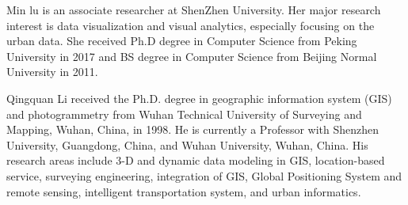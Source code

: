 \documentclass{ieeeaccess}
\begin{document}
\begin{IEEEbiography}{Min lu} is an associate researcher at ShenZhen University. Her major research interest is data visualization and visual analytics, especially focusing on the urban data. She received Ph.D degree in Computer Science from Peking University in 2017 and BS degree in Computer Science from Beijing Normal University in 2011.
\end{IEEEbiography}

\begin{IEEEbiography}{Qingquan Li} received the Ph.D. degree in geographic information system (GIS) and photogrammetry from Wuhan Technical University of Surveying and Mapping, Wuhan, China, in 1998. He is currently a Professor with Shenzhen University, Guangdong, China, and Wuhan University, Wuhan, China. His research areas include 3-D and dynamic data modeling in GIS, location-based service, surveying engineering, integration of GIS, Global Positioning System and remote sensing, intelligent transportation system, and urban informatics.
\end{IEEEbiography}

\EOD
\end{document}
